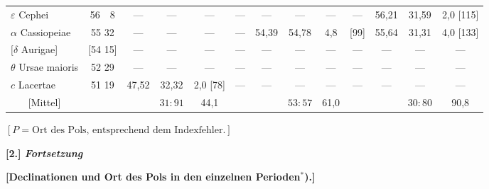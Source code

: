\documentclass[12pt,a4paper]{article}
\theoremstyle{plain}
\theoremstyle{definition}
\theoremstyle{remark}
\begin{document}
{\begin{center}
\begin{tabular}{l|c c c c | c c c c | c c c c}
$\varepsilon$ Cephei & 56\ \ 8 & --- & --- & --- & --- & --- & --- & --- & --- & 56,21 & 31,59 & 2,0 [115] \\
$\alpha$ Cassiopeiae & 55 32 & --- & --- & --- & --- & 54,39 & 54,78 & 4,8 & [99] & 55,64 & 31,31 & 4,0 [133] \\
$[\delta$ Aurigae] & [54 15] & --- & --- & --- & --- & --- & --- & --- & --- & --- & --- & --- \\
\midrule
$\theta$ Ursae maioris & 52 29 & --- & --- & --- & --- & --- & --- & --- & --- & --- & --- & --- \\
$c$ Lacertae & 51 19 & 47,52 & 32,32 & 2,0 [78] & --- & --- & --- & --- & --- & --- & --- & --- \\
\midrule
\multicolumn{1}{c|}{[Mittel]} & & & $31\!\!:\!\!91$ & 44,1 & & & $53\!\!:\!\!57$ & 61,0 & & & $30\!\!:\!\!80$ & 90,8 \\
\bottomrule
\end{tabular}
\end{center}
}

\smallskip
\begin{center}
$[P = \text{Ort des Pols, entsprechend dem Indexfehler.}]$
\end{center}

\newpage
\begin{center}
\textbf{[2.] \textit{Fortsetzung}}
\end{center}

\begin{center}
\textbf{[Declinationen und Ort des Pols in den einzelnen Perioden$^*$).]}
\end{center}
\end{document}
